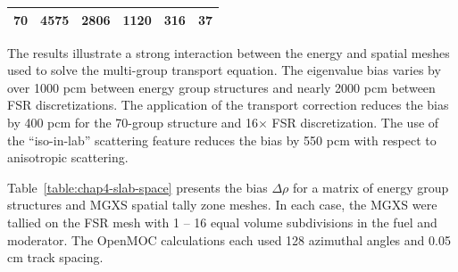 \begin{table}[h!]
\begin{tabular}{a S[table-format=6.1] S[table-format=6.1] S[table-format=6.1] S[table-format=6.1] S[table-format=6.1]}
70 & 4575 & 2806 & 1120 & 316 & {} 37 \\
  \bottomrule
\end{tabular}
\end{table}

The results illustrate a strong interaction between the energy and spatial meshes used to solve the multi-group transport equation. The eigenvalue bias varies by over 1000 pcm between energy group structures and nearly 2000 pcm between \ac{FSR} discretizations. The application of the transport correction reduces the bias by 400 pcm for the 70-group structure and 16$\times$ \ac{FSR} discretization. The use of the ``iso-in-lab'' scattering feature reduces the bias by 550 pcm with respect to anisotropic scattering. 

Table~\ref{table:chap4-slab-space} presents the bias $\Delta\rho$ for a matrix of energy group structures and \ac{MGXS} spatial tally zone meshes. In each case, the \ac{MGXS} were tallied on the \ac{FSR} mesh with 1 -- 16 equal volume subdivisions in the fuel and moderator. The OpenMOC calculations each used 128 azimuthal angles and 0.05 cm track spacing.

